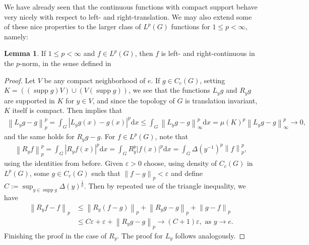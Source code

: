 \documentclass[10pt,twoside,openany,final]{memoir}
\theoremstyle{definition}
\newtheorem{lemma}[theorem]{Lemma}
\theoremstyle{Break}
\newcommand{\lv}{\left\lVert}
\newcommand{\rv}{\right\rVert}
\DeclareMathOperator{\supp}{supp}
\renewcommand{\d}{\mathrm{d}}
\begin{document}
We have already seen that the continuous functions with compact support behave very nicely with respect to left- and right-translation. We may also extend some of these nice properties to the larger class of $L^p(G)$ functions for $1 \leq p < \infty$, namely:
\begin{lemma}
	If $1 \leq p < \infty$ and $f \in L^p(G)$, then $f$ is left- and right-continuous in the $p$-norm, in the sense defined in 
	\label{Lp unif conv}
\end{lemma}
\begin{proof}
	Let $V$ be any compact neighborhood of $e$. If $g \in C_c(G)$, setting $K= \left( \left(\supp g \right)V \right) \cup \left( V \left(\supp g \right)\right)$, we see that the functions $L_y g$ and $R_y g$ are supported in $K$ for $y \in V$, and since the topology of $G$ is translation invariant, $K$ itself is compact. Then  implies that 
	\begin{align*}
		\lv L_y g-g \rv_p^p = \int_G |L_y g(x)-g(x)|^p \d x \leq \int_G \lv L_y g - g\rv_\infty^p \d x = \mu(K)^p \lv L_y g-g \rv_\infty^p \to 0,
	\end{align*}
	and the same holds for $R_y g-g$. For $f \in L^p(G)$, note that 
\begin{align*}
	\lv R_y f \rv_p^p = \int_G |R_y f(x)|^p \d x  = \int_G R_y^p |f(x)|^p \d x = \int_G \Delta(y^{-1})^p \lv f \rv_p^p,
\end{align*}
using the identities from before. Given $\varepsilon>0$ choose, using density of $C_c(G)$ in $L^p(G)$, some $g \in C_c(G)$ such that $\lv f-g \rv_p < \varepsilon$ and define $\displaystyle C:=\sup_{y \in \supp g} \Delta(y)^{\frac{1}{p}}$. Then by repeated use of the triangle inequality, we have
\begin{align*}
	\lv R_y f - f \rv_p &\leq \lv R_y (f-g) \rv_p + \lv R_yg -g\rv_p + \lv g-f \rv_p \\
	&\leq C \varepsilon+\varepsilon+\lv R_y g-g\rv_p \to (C+1)\varepsilon, \text{ as } y \to e.
\end{align*}
Finishing the proof in the case of $R_y$. The proof for $L_y$ follows analogously.
\end{proof}
\end{document}
